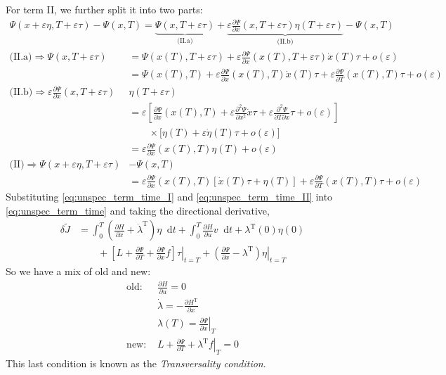 \documentclass[letterpaper,12pt,titlepage]{report}
\newcommand*\dif{\mathop{}\!\mathrm{d}}
\newcommand{\trans}{^\text{T}}
\newcommand*\pder[2]{\frac{\partial #1}{\partial #2}}
\theoremstyle{plain}
\theoremstyle{definition}
\begin{document}
For term II, we further split it into two parts:
\begin{gather}
  \Psi(x+\varepsilon\eta,T+\varepsilon\tau) - \Psi(x,T) = \underbrace{\Psi(x,T+\varepsilon\tau)}_{\displaystyle\text{(II.a)}} + \underbrace{\varepsilon\pder{\Psi}{x}(x,T+\varepsilon\tau)\eta(T+\varepsilon\tau)}_{\displaystyle\text{(II.b)}} - \Psi(x,T)
\end{gather}
\begin{align}
  \text{(II.a)}\Longrightarrow \Psi(x,T+\varepsilon\tau) &= \Psi(x(T),T+\varepsilon\tau) + \varepsilon\pder{\Psi}{x}(x(T),T+\varepsilon\tau)\dot x(T)\tau + o(\varepsilon) \\
                                                         &= \Psi(x(T),T) + \varepsilon\pder{\Psi}{x}(x(T),T)\dot x(T)\tau + \varepsilon\pder{\Psi}{T}(x(T),T)\tau + o(\varepsilon) \\
  \text{(II.b)}\Longrightarrow \varepsilon\pder{\Psi}{x}(x,T+\varepsilon\tau) & \eta(T+\varepsilon\tau) \\
                                                         & = \varepsilon \left[ \pder{\Psi}{x}(x(T),T) + \varepsilon\pder{^2\Psi}{x^2}\dot x\tau + \varepsilon\pder{^2\Psi}{T\partial x}\tau + o(\varepsilon) \right] \\
                                                         & \qquad \times \Big[\eta(T) + \varepsilon\dot\eta(T)\tau + o(\varepsilon)\Big] \\
                                                         &= \varepsilon\pder{\Psi}{x}(x(T),T)\eta(T) + o(\varepsilon) \\
  \text{(II)} \Longrightarrow  \Psi(x+\varepsilon\eta,T+\varepsilon\tau) & - \Psi(x,T) \\
                                                         &= \varepsilon\pder{\Psi}{x}(x(T),T)[\dot x(T)\tau + \eta(T)] + \varepsilon\pder{\Psi}{T}(x(T),T)\tau + o(\varepsilon) \label{eq:unspec_term_time_II}
\end{align}
Substituting \eqref{eq:unspec_term_time_I} and \eqref{eq:unspec_term_time_II} into \eqref{eq:unspec_term_time} and taking the directional derivative,
\begin{align}
  \delta\tilde J &= \int_0^T \left(\pder{H}{x}+\dot\lambda\trans\right)\eta\dif t + \int_0^T\pder{H}{u}v\dif t + \lambda\trans(0)\eta(0) \\
                 & \qquad + \left. \left[L + \pder{\Psi}{T} + \pder{\Psi}{x} f\right] \tau \right|_{t=T} + \left. \left(\pder{\Psi}{x} - \lambda\trans\right)\eta \right|_{t=T}
\end{align}
So we have a mix of old and new:
\begin{align}
  \text{old: } & \pder{H}{u} = 0 \\
               & \dot\lambda = -\pder{H\trans}{x} \\
               & \lambda(T) = \left. \pder{\Psi}{x} \right|_T \\
  \text{new: } & \left. L + \pder{\Psi}{T} + \lambda\trans f \right|_T = 0
\end{align}
This last condition is known as the \emph{Transversality condition}.
\end{document}
